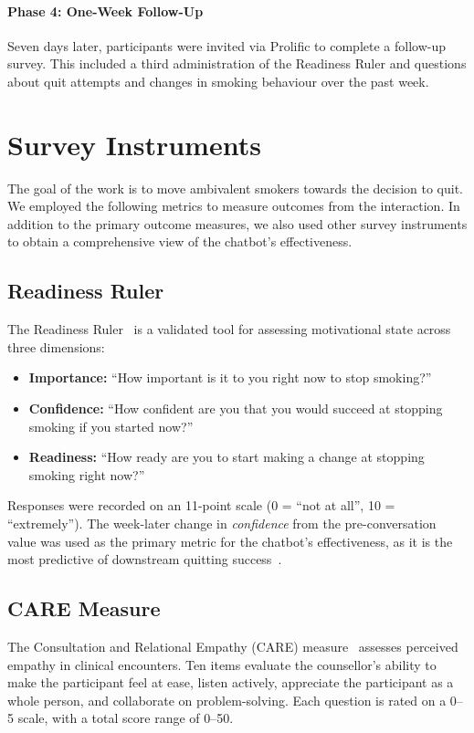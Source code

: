 \paragraph{Phase 4: One-Week Follow-Up}
Seven days later, participants were invited via Prolific to complete a follow-up survey. This included a third administration of the Readiness Ruler and questions about quit attempts and changes in smoking behaviour over the past week.

\section{Survey Instruments}
\label{subsec:survey-instruments}

The goal of the work is to move ambivalent smokers towards the decision to quit. We employed the following metrics to measure outcomes from the interaction. In addition to the primary outcome measures, we also used other survey instruments to obtain a comprehensive view of the chatbot's effectiveness.

\subsection{Readiness Ruler}
\label{subsec:readiness-ruler}
The Readiness Ruler~\citep{rollnick1992development} is a validated tool for assessing motivational state across three dimensions:
\begin{itemize}
    \item \textbf{Importance:} ``How important is it to you right now to stop smoking?''
    \item \textbf{Confidence:} ``How confident are you that you would succeed at stopping smoking if you started now?''
    \item \textbf{Readiness:} ``How ready are you to start making a change at stopping smoking right now?''
\end{itemize}
Responses were recorded on an 11-point scale (0 = ``not at all'', 10 = ``extremely''). The week-later change in \emph{confidence} from the pre-conversation value was used as the primary metric for the chatbot's effectiveness, as it is the most predictive of downstream quitting success~\citep{Gwaltney2009-wj,Abar2013}.

\subsection{CARE Measure}
\label{subsec:care}
The Consultation and Relational Empathy (CARE) measure~\citep{10.1093/fampra/cmh621,Bikker2015} assesses perceived empathy in clinical encounters. Ten items evaluate the counsellor's ability to make the participant feel at ease, listen actively, appreciate the participant as a whole person, and collaborate on problem-solving. Each question is rated on a 0--5 scale, with a total score range of 0--50.

